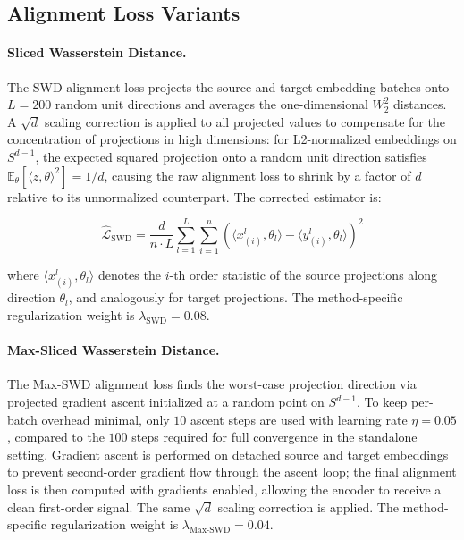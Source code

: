 \documentclass{article}
\begin{document}
	\subsection{Alignment Loss Variants}
	
	\paragraph{Sliced Wasserstein Distance.}
	The SWD alignment loss projects the source and target embedding batches onto $L = 200$ random unit directions and averages the one-dimensional $W_2^2$ distances. A $\sqrt{d}$ scaling correction is applied to all projected values to compensate for the concentration of projections in high dimensions: for L2-normalized embeddings on $S^{d-1}$, the expected squared projection onto a random unit direction satisfies $\mathbb{E}_\theta[\langle z, \theta \rangle^2] = 1/d$, causing the raw alignment loss to shrink by a factor of $d$ relative to its unnormalized counterpart. The corrected estimator is:
	
	\begin{equation}
		\widehat{\mathcal{L}}_{\mathrm{SWD}} = \frac{d}{n \cdot L} 
		\sum_{l=1}^{L} \sum_{i=1}^{n} 
		\left(\langle x_{(i)}^l, \theta_l \rangle - 
		\langle y_{(i)}^l, \theta_l \rangle\right)^2
		\label{eq:swd_loss}
	\end{equation}
	
	where $\langle x_{(i)}^l, \theta_l \rangle$ denotes the $i$-th order statistic of the source projections along direction $\theta_l$, and analogously for target projections. The method-specific regularization weight is $\lambda_{\mathrm{SWD}} = 0.08$.
	
	\paragraph{Max-Sliced Wasserstein Distance.}
	The Max-SWD alignment loss finds the worst-case projection direction via projected gradient ascent initialized at a random point on $S^{d-1}$. To keep per-batch overhead minimal, only $10$ ascent steps are used with learning rate $\eta = 0.05$, compared to the $100$ steps required for full convergence in the standalone setting. Gradient ascent is performed on detached source and target embeddings to prevent second-order gradient flow through the ascent loop; the final alignment loss is then computed with gradients enabled, allowing the encoder to receive a clean first-order signal. The same $\sqrt{d}$ scaling correction is applied. The method-specific regularization weight is $\lambda_{\mathrm{Max\text{-}SWD}} = 0.04$.
	
\end{document}
